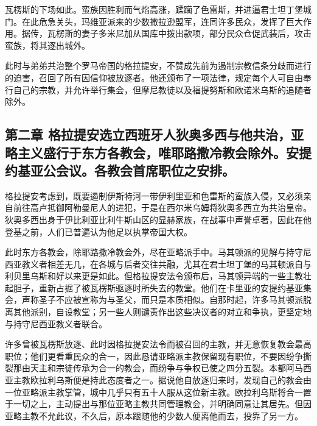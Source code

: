 瓦楞斯的下场如此。蛮族因胜利而气焰高涨，蹂躏了色雷斯，并进逼君士坦丁堡城门。在此危急关头，玛维亚派来的少数撒拉逊盟军，连同许多民众，发挥了巨大作用。据传，瓦楞斯的妻子多米尼加从国库中拨出款项，部分民众仓促武装后，攻击蛮族，将其逐出城外。\par

此时与弟弟共治整个罗马帝国的格拉提安，不赞成先前为遏制宗教信条分歧而进行的迫害，召回了所有因信仰被放逐者。他还颁布了一项法律，规定每个人可自由奉行自己的宗教，并允许举行集会，但摩尼教徒以及福提努斯和欧诺米乌斯的追随者除外。\par


\subsection{第二章 格拉提安选立西班牙人狄奥多西与他共治，亚略主义盛行于东方各教会，唯耶路撒冷教会除外。安提约基亚公会议。各教会首席职位之安排。}

格拉提安考虑到，既要遏制伊斯特河一带伊利里亚和色雷斯的蛮族入侵，又必须亲自前往高卢抵御阿勒曼尼人的进犯，于是在西尔米乌姆将狄奥多西立为共治皇帝。狄奥多西出身于伊比利亚比利牛斯山区的显赫家族，在战事中声誉卓著，因此在他登基之前，人们已普遍认为他足以执掌帝国大权。\par

此时东方各教会，除耶路撒冷教会外，尽在亚略派手中。马其顿派的见解与持守尼西亚教义者相差无几，在各城与后者交往共融，尤其在君士坦丁堡的马其顿派自与利贝里乌斯和好以来更是如此。但格拉提安法令颁布后，马其顿异端的一些主教壮起胆子，重新占据了被瓦楞斯驱逐时所失去的教堂。他们在卡里亚的安提约基亚集会，声称圣子不应被宣称为与圣父，而只是本质相似。自那时起，许多马其顿派脱离其他派别，自设教堂；另一些人则谴责作出这些决议者的对立和争执，更坚定地与持守尼西亚教义者联合。\par

许多曾被瓦楞斯放逐、此时因格拉提安法令而被召回的主教，并无意恢复教会最高职位；他们更看重民众的合一，因此恳请亚略派主教保留现有职位，不要因纷争撕裂那由天主和宗徒传承为合一的教会，而纷争与争权已使之四分五裂。本都阿马西亚主教欧拉利乌斯便是持此态度者之一。据说他自放逐归来时，发现自己的教会由一位亚略派主教掌管，城中几乎只有五十人服从这位新主教。欧拉利乌斯将合一置于一切之上，主动提出与那位亚略主教共同管理教会，并明确同意让其居先。但因亚略主教不允此议，不久后，原本跟随他的少数人便离他而去，投靠了另一方。\par


